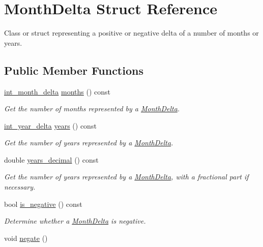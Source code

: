 \hypertarget{structMonthDelta}{\section{Month\-Delta Struct Reference}
\label{structMonthDelta}
}


Class or struct representing a positive or negative delta of a number of months or years.  


\subsection*{Public Member Functions}
\begin{DoxyCompactItemize}
\item 
\hyperlink{types_8h_adc711c00c117528b40875ad0119c687f}{int\-\_\-month\-\_\-delta} \hyperlink{structMonthDelta_a47f7592328f434f4091a5b044d83976a}{months} () const 
\begin{DoxyCompactList}\small\item\em Get the number of months represented by a \hyperlink{structMonthDelta}{Month\-Delta}. \end{DoxyCompactList}\item 
\hyperlink{types_8h_ad2a6eecbd190f1ae0327acdeaf596623}{int\-\_\-year\-\_\-delta} \hyperlink{structMonthDelta_abd1a36332a0347d39a9a7b7befceb6f5}{years} () const 
\begin{DoxyCompactList}\small\item\em Get the number of years represented by a \hyperlink{structMonthDelta}{Month\-Delta}. \end{DoxyCompactList}\item 
double \hyperlink{structMonthDelta_ae7ac38d813d15ea4b9db82a43ed1be89}{years\-\_\-decimal} () const 
\begin{DoxyCompactList}\small\item\em Get the number of years represented by a \hyperlink{structMonthDelta}{Month\-Delta}, with a fractional part if necessary. \end{DoxyCompactList}\item 
bool \hyperlink{structMonthDelta_a4f0b4051d92cd180ac5f9f7466a36f57}{is\-\_\-negative} () const 
\begin{DoxyCompactList}\small\item\em Determine whether a \hyperlink{structMonthDelta}{Month\-Delta} is negative. \end{DoxyCompactList}\item 
void \hyperlink{structMonthDelta_a88f17c6793e3e48ac00a70e12b9045d3}{negate} ()

\end{DoxyCompactItemize}
